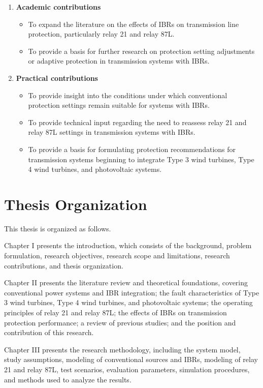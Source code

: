 \begin{enumerate}
	\item \textbf{Academic contributions}
	      \begin{itemize}
		      \item To expand the literature on the effects of IBRs on transmission line protection, particularly relay 21 and relay 87L.
		      \item To provide a basis for further research on protection setting adjustments or adaptive protection in transmission systems with IBRs.
	      \end{itemize}
	\item \textbf{Practical contributions}
	      \begin{itemize}
		      \item To provide insight into the conditions under which conventional protection settings remain suitable for systems with IBRs.
		      \item To provide technical input regarding the need to reassess relay 21 and relay 87L settings in transmission systems with IBRs.
		      \item To provide a basis for formulating protection recommendations for transmission systems beginning to integrate Type 3 wind turbines, Type 4 wind turbines, and photovoltaic systems.
	      \end{itemize}
\end{enumerate}

\section{Thesis Organization}

This thesis is organized as follows.

\noindent Chapter I presents the introduction, which consists of the background, problem formulation, research objectives, research scope and limitations, research contributions, and thesis organization.

\noindent Chapter II presents the literature review and theoretical foundations, covering conventional power systems and IBR integration; the fault characteristics of Type 3 wind turbines, Type 4 wind turbines, and photovoltaic systems; the operating principles of relay 21 and relay 87L; the effects of IBRs on transmission protection performance; a review of previous studies; and the position and contribution of this research.

\noindent Chapter III presents the research methodology, including the system model, study assumptions, modeling of conventional sources and IBRs, modeling of relay 21 and relay 87L, test scenarios, evaluation parameters, simulation procedures, and methods used to analyze the results.

